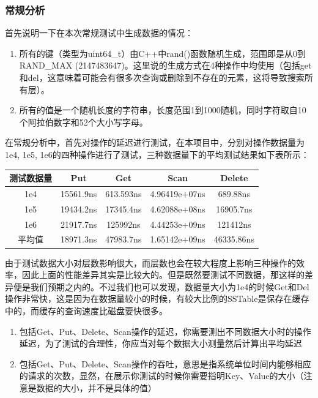 \documentclass{article}
\begin{document}
\subsubsection{常规分析}

首先说明一下在本次常规测试中生成数据的情况：

\begin{enumerate}
    \item 所有的键（类型为uint64\_t）由C++中rand()函数随机生成，范围即是从0到RAND\_MAX (2147483647)。这里说的生成方式在4种操作中均使用（包括get和del，这意味着可能会有很多次查询或删除到不存在的元素，这将导致搜索所有层）。
    \item 所有的值是一个随机长度的字符串，长度范围1到1000随机，同时字符取自10个阿拉伯数字和52个大小写字母。
\end{enumerate}

在常规分析中，首先对操作的延迟进行测试，在本项目中，分别对操作数据量为1e4, 1e5, 1e6的四种操作进行了测试，三种数据量下的平均测试结果如下表所示：

\begin{table}[h]
    \centering
    \begin{tabular}{ccccc}
        \toprule
        测试数据量 & Put       & Get       & Scan          & Delete     \\
        \midrule
        1e4        & 15561.9ns & 613.593ns & 4.96419e+07ns & 689.88ns   \\
        1e5        & 19434.2ns & 17345.4ns & 4.62088e+08ns & 16905.7ns  \\
        1e6        & 21917.7ns & 125992ns  & 4.44253e+09ns & 121412ns   \\
        平均值     & 18971.3ns & 47983.7ns & 1.65142e+09ns & 46335.86ns \\
        \bottomrule
    \end{tabular}
\end{table}

由于测试数据大小对层数影响很大，而层数也会在较大程度上影响三种操作的效率，因此上面的性能差异其实是比较大的。但是既然要测试不同数据，那这样的差异便是我们预期之内的。不过我们也可以发现，数据量大小为1e4的时候Get和Del操作非常快，这是因为在数据量较小的时候，有较大比例的SSTable是保存在缓存中的，而缓存的查询速度比磁盘要快很多。

\begin{enumerate}
    \item 包括Get、Put、Delete、Scan操作的延迟，你需要测出不同数据大小时的操作延迟，为了测试的合理性，你应当对每个数据大小测量然后计算出平均延迟
    \item 包括Get、Put、Delete、Scan操作的吞吐，意思是指系统单位时间内能够相应的请求的次数，显然，在展示你测试的时候你需要指明Key、Value的大小（注意是数据的大小，并不是具体的值）
\end{enumerate}
\end{document}
